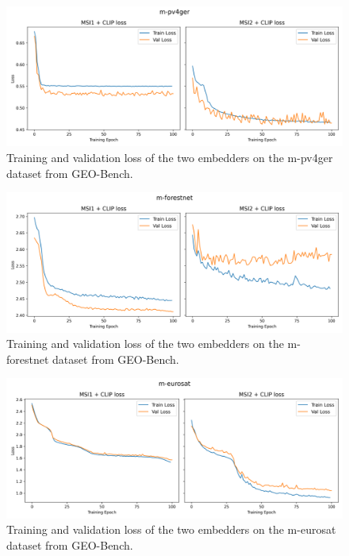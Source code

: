 \documentclass[a4paper, twoside, english]{sapthesis} %
\begin{document}
\begin{figure}[h]
    \centering
    \includegraphics[width=\textwidth]{img/m-pv4ger_loss_plot.png}
    \caption{\normalsize Training and validation loss of the two embedders on the m-pv4ger dataset from GEO-Bench.}
    \label{fig:solarloss}
\end{figure}

\vspace{-0.3cm}

\begin{figure}[h]
    \centering
    \includegraphics[width=\textwidth]{img/m-forestnet_loss_plot.png}
    \caption{\normalsize Training and validation loss of the two embedders on the m-forestnet dataset from GEO-Bench.}
    \label{fig:foresloss}
\end{figure}

\begin{figure}[h]
    \centering
    \includegraphics[width=\textwidth]{img/m-eurosat_loss_plot.png}
    \caption{\normalsize Training and validation loss of the two embedders on the m-eurosat dataset from GEO-Bench.}
    \label{fig:meurosatloss}
\end{figure}
\end{document}
